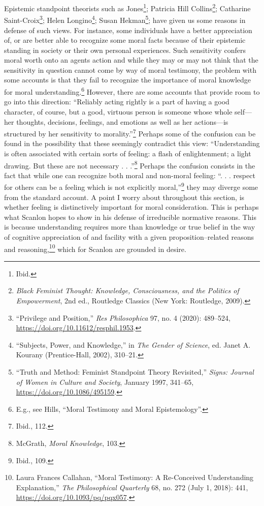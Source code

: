 \documentclass[phdthesis,12pt,final]{wuthesis}
\theoremstyle{definition}
\theoremstyle{definition}
\theoremstyle{definition}
\theoremstyle{definition}
\theoremstyle{remark}
\begin{document}
Epistemic standpoint theorists such as Jones\footnote{Ibid.}; Patricia Hill Collins\footnote{\emph{Black Feminist Thought: Knowledge, Consciousness, and the Politics of Empowerment}, 2nd ed., Routledge Classics (New York: Routledge, 2009).}; Catharine Saint-Croix\footnote{{``Privilege and {Position},''} \emph{Res Philosophica} 97, no. 4 (2020): 489--524, \url{https://doi.org/10.11612/resphil.1953}.}; Helen Longino\footnote{{``Subjects, {Power}, and {Knowledge},''} in \emph{The {Gender} of {Science}}, ed. Janet A. Kourany (Prentice-Hall, 2002), 310--21.}; Susan Hekman\footnote{{``Truth and Method: {Feminist} Standpoint Theory Revisited,''} \emph{Signs: Journal of Women in Culture and Society}, January 1997, 341--65, \url{https://doi.org/10.1086/495159}.}; have given us some reasons in defense of such views. For instance, some individuals have a better appreciation of, or are better able to recognize some moral facts because of their epistemic standing in society or their own personal experiences. Such sensitivity confers moral worth onto an agent\textquotesingle s action and while they may or may not think that the sensitivity in question cannot come by way of moral testimony, the problem with some accounts is that they fail to recognize the importance of moral knowledge for moral understanding.\footnote{E.g., see Hills, {``Moral Testimony and Moral Epistemology''}.} However, there are some accounts that provide room to go into this direction: ``Reliably acting rightly is a part of having a good character, of course, but a good, virtuous person is someone whose whole self---her thoughts, decisions, feelings, and emotions as well as her actions---is structured by her sensitivity to morality.''\footnote{Ibid., 112.} Perhaps some of the confusion can be found in the possibility that these seemingly contradict this view: ``Understanding is often associated with certain sorts of feeling: a flash of enlightenment; a light drawing. But these are not necessary . . .''\footnote{McGrath, \emph{Moral {Knowledge}}, 103.} Perhaps the confusion consists in the fact that while one can recognize both moral and non-moral feeling: ``. . . respect for others can be a feeling which is not explicitly moral,''\footnote{Ibid., 109.} they may diverge some from the standard account. A point I worry about throughout this section, is whether feeling is distinctively important for moral consideration. This is perhaps what Scanlon hopes to show in his defense of irreducible normative reasons. This is because understanding requires more than knowledge or true belief in the way of cognitive appreciation of and facility with a given proposition--related reasons and reasoning,\footnote{Laura Frances Callahan, {``Moral {Testimony}: {A Re-Conceived Understanding Explanation},''} \emph{The Philosophical Quarterly} 68, no. 272 (July 1, 2018): 441, \url{https://doi.org/10.1093/pq/pqx057}.} which for Scanlon are grounded in desire.
\end{document}

